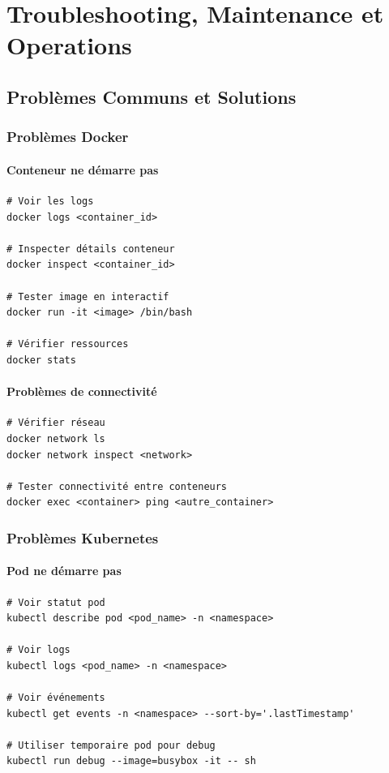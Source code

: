 \documentclass[12pt,a4paper]{report}
\begin{document}
\chapter{Troubleshooting, Maintenance et Operations}

\section{Problèmes Communs et Solutions}

\subsection{Problèmes Docker}

\subsubsection{Conteneur ne démarre pas}

\lstset{language=bash}
\begin{lstlisting}
# Voir les logs
docker logs <container_id>

# Inspecter détails conteneur
docker inspect <container_id>

# Tester image en interactif
docker run -it <image> /bin/bash

# Vérifier ressources
docker stats
\end{lstlisting}

\subsubsection{Problèmes de connectivité}

\lstset{language=bash}
\begin{lstlisting}
# Vérifier réseau
docker network ls
docker network inspect <network>

# Tester connectivité entre conteneurs
docker exec <container> ping <autre_container>
\end{lstlisting}

\subsection{Problèmes Kubernetes}

\subsubsection{Pod ne démarre pas}

\lstset{language=bash}
\begin{lstlisting}
# Voir statut pod
kubectl describe pod <pod_name> -n <namespace>

# Voir logs
kubectl logs <pod_name> -n <namespace>

# Voir événements
kubectl get events -n <namespace> --sort-by='.lastTimestamp'

# Utiliser temporaire pod pour debug
kubectl run debug --image=busybox -it -- sh
\end{lstlisting}
\end{document}
